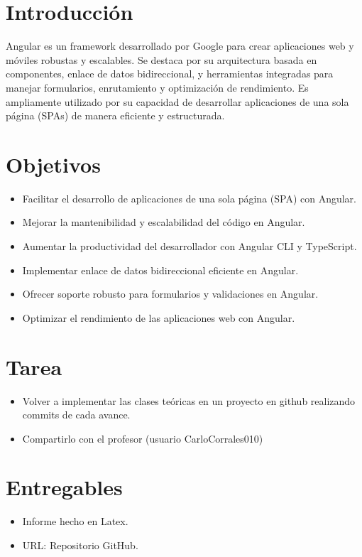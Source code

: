 \documentclass{article}
\begin{document}
  \section{Introducción}
  Angular es un framework desarrollado por Google para crear aplicaciones web y móviles robustas y escalables. 
  Se destaca por su arquitectura basada en componentes, enlace de datos bidireccional, y herramientas integradas 
  para manejar formularios, enrutamiento y optimización de rendimiento. Es ampliamente utilizado por su capacidad 
  de desarrollar aplicaciones de una sola página (SPAs) de manera eficiente y estructurada.


  \section{Objetivos}
  \begin{itemize}
    \item Facilitar el desarrollo de aplicaciones de una sola página (SPA) con Angular.
    \item Mejorar la mantenibilidad y escalabilidad del código en Angular.
    \item Aumentar la productividad del desarrollador con Angular CLI y TypeScript.
    \item Implementar enlace de datos bidireccional eficiente en Angular.
    \item Ofrecer soporte robusto para formularios y validaciones en Angular.
    \item Optimizar el rendimiento de las aplicaciones web con Angular.
  \end{itemize}

 
	\section{Tarea}
  \begin{itemize}
    \item Volver a implementar las clases teóricas en un proyecto en github realizando commits de cada avance.  
    \item Compartirlo con el profesor (usuario CarloCorrales010)
  \end{itemize}
  
 
  \section{Entregables}
  \begin{itemize}
    \item Informe hecho en Latex.
    \item URL: Repositorio GitHub.
  \end{itemize}
  
\end{document}
